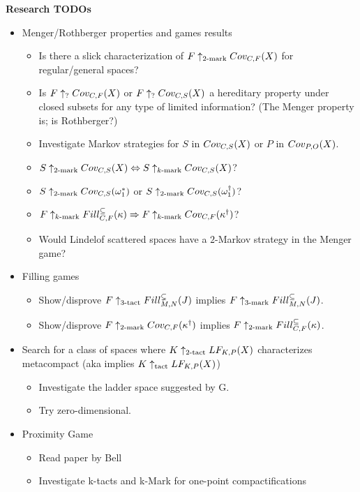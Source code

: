 


\centerline{\bf Research TODOs}

  \begin{itemize}
    \item Menger/Rothberger properties and games results
      \begin{itemize}
        \item Is there a slick characterization of $F\uparrow_{2\text{-mark}}Cov_{C,F}(X)$ for regular/general spaces?
        \item Is $F\uparrow_{?}Cov_{C,F}(X)$ or $F\uparrow_{?}Cov_{C,S}(X)$ a hereditary property under closed subsets for any type of limited information? (The Menger property is; is Rothberger?)
        \item Investigate Markov strategies for $S$ in $Cov_{C,S}(X)$ or $P$ in $Cov_{P,O}(X)$.
        \item $S\uparrow_{2\text{-mark}}Cov_{C,S}(X)\Leftrightarrow S\uparrow_{k\text{-mark}}Cov_{C,S}(X)$?
        \item $S\uparrow_{2\text{-mark}}Cov_{C,S}(\omega_1^*)$ or $S\uparrow_{2\text{-mark}}Cov_{C,S}(\omega_1^\dagger)$?
        \item $F\uparrow_{k\text{-mark}}Fill^{\subseteq}_{C,F}(\kappa) \Rightarrow F\uparrow_{k\text{-mark}}Cov_{C,F}(\kappa^\dagger)$?
        \item Would Lindelof scattered spaces have a $2$-Markov strategy in the Menger game?
      \end{itemize}
    \item Filling games
      \begin{itemize}
        \item Show/disprove $F\uparrow_{3\text{-tact}}Fill^{\subsetneq}_{M,N}(J)$ implies $F\uparrow_{3\text{-mark}}Fill^{\subseteq}_{M,N}(J)$.
        \item Show/disprove $F\uparrow_{2\text{-mark}}Cov_{C,F}(\kappa^\dagger)$ implies $F\uparrow_{2\text{-mark}}Fill^{\subseteq}_{C,F}(\kappa)$.
      \end{itemize}
    \item Search for a class of spaces where $K\uparrow_{2\text{-tact}}LF_{K,P}(X)$ characterizes metacompact (aka implies $K\uparrow_{\text{tact}}LF_{K,P}(X)$)
      \begin{itemize}
        \item Investigate the ladder space suggested by G.
        \item Try zero-dimensional.
      \end{itemize}
    \item Proximity Game
      \begin{itemize}
        \item Read paper by Bell
        \item Investigate k-tacts and k-Mark for one-point compactifications
      \end{itemize}
  \end{itemize}
